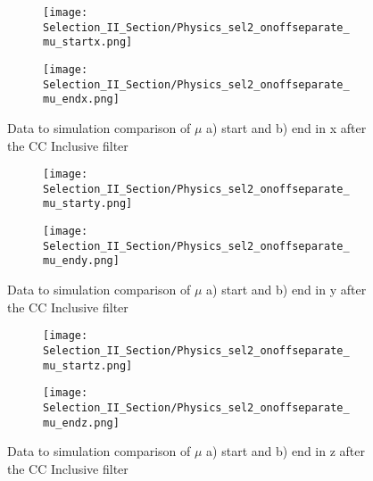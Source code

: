 \begin{figure}[t!]
  \begin{subfigure}[t]{0.3\textwidth}
\texttt{[image: Selection\_II\_Section/Physics\_sel2\_onoffseparate\_mu\_startx.png]}
   \caption{ }
  \end{subfigure} 
  \hspace{34 mm}
  \begin{subfigure}[t]{0.3\textwidth}
\texttt{[image: Selection\_II\_Section/Physics\_sel2\_onoffseparate\_mu\_endx.png]}
   \caption{ }
  \end{subfigure} 
\caption{ Data to simulation comparison of $\mu$ a) start and b) end in x after the CC Inclusive filter }
\label{fig:physics_sel2_x}
\end{figure}

\begin{figure}[t!]
  \begin{subfigure}[t]{0.3\textwidth}
\texttt{[image: Selection\_II\_Section/Physics\_sel2\_onoffseparate\_mu\_starty.png]}
   \caption{ }
  \end{subfigure} 
  \hspace{34 mm}
  \begin{subfigure}[t]{0.3\textwidth}
\texttt{[image: Selection\_II\_Section/Physics\_sel2\_onoffseparate\_mu\_endy.png]}
   \caption{ }
  \end{subfigure} 
\caption{ Data to simulation comparison of $\mu$ a) start and b) end in y after the CC Inclusive filter }
\label{fig:physics_sel2_y}
\end{figure}

\begin{figure}[t!]
  \begin{subfigure}[t]{0.3\textwidth}
\texttt{[image: Selection\_II\_Section/Physics\_sel2\_onoffseparate\_mu\_startz.png]}
   \caption{ }
  \end{subfigure} 
  \hspace{34mm}
  \begin{subfigure}[t]{0.3\textwidth}
\texttt{[image: Selection\_II\_Section/Physics\_sel2\_onoffseparate\_mu\_endz.png]}
   \caption{ }
  \end{subfigure} 

\caption{ Data to simulation comparison of $\mu$ a) start and b) end in z after the CC Inclusive filter }
\label{fig:physics_sel2_z}
\end{figure}
